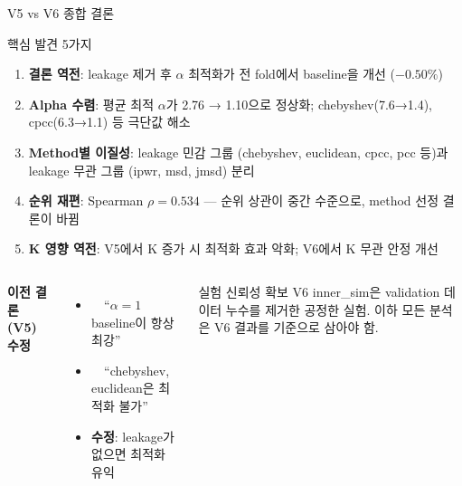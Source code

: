 \documentclass[aspectratio=169,10pt]{beamer}
\begin{document}
\begin{frame}{V5 vs V6 종합 결론}
	\begin{block}{핵심 발견 5가지}
		\begin{enumerate}
			\item \textbf{결론 역전}: leakage 제거 후 $\alpha$ 최적화가 전 fold에서 baseline을 개선 ($-0.50\%$)
			\item \textbf{Alpha 수렴}: 평균 최적 $\alpha$가 2.76 → 1.10으로 정상화; chebyshev(7.6→1.4), cpcc(6.3→1.1) 등 극단값 해소
			\item \textbf{Method별 이질성}: leakage 민감 그룹 (chebyshev, euclidean, cpcc, pcc 등)과 leakage 무관 그룹 (ipwr, msd, jmsd) 분리
			\item \textbf{순위 재편}: Spearman $\rho=0.534$ — 순위 상관이 중간 수준으로, method 선정 결론이 바뀜
			\item \textbf{K 영향 역전}: V5에서 K 증가 시 최적화 효과 악화; V6에서 K 무관 안정 개선
		\end{enumerate}
	\end{block}

	\vspace{0.3em}
	\begin{columns}[T]
			\textbf{이전 결론 (V5) 수정}
			\begin{itemize}
				\item ~~``$\alpha=1$ baseline이 항상 최강''~~
				\item ~~``chebyshev, euclidean은 최적화 불가''~~
				\item \textbf{수정}: leakage가 없으면 최적화 유익
			\end{itemize}

			\begin{exampleblock}{실험 신뢰성 확보}
				V6 inner\_sim은 validation 데이터 누수를 제거한 공정한 실험.
				이하 모든 분석은 V6 결과를 기준으로 삼아야 함.
			\end{exampleblock}
	\end{columns}
\end{frame}
\end{document}
